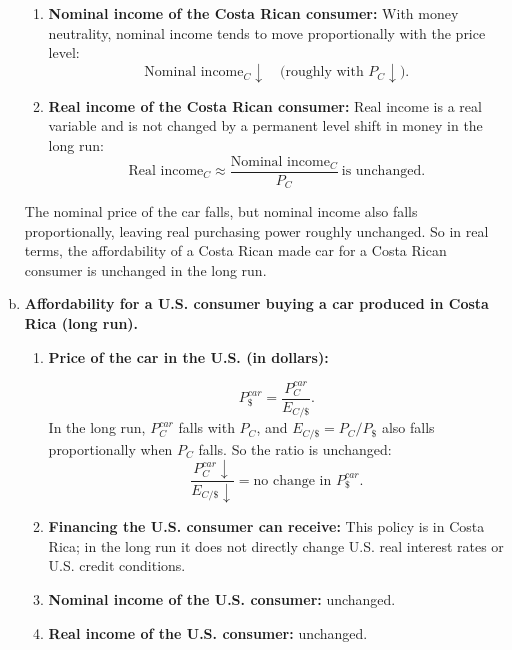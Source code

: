 \documentclass[11pt]{article}
\newcommand{\usd}{\text{\$}}
\newenvironment{problem}[2][Problem]{\begin{trivlist}
\item[\hskip \labelsep {\bfseries #1}\hskip \labelsep {\bfseries #2.}]
\leavevmode\par
}{\end{trivlist}}
\begin{document}
\begin{problem}{1}
\begin{enumerate}[(a)]
\begin{enumerate}[(1)]
\item \textbf{Nominal income of the Costa Rican consumer:}
With money neutrality, nominal income tends to move proportionally with the price level:
\[
\text{Nominal income}_C \downarrow \quad \text{(roughly with } P_C\downarrow\text{).}
\]

\item \textbf{Real income of the Costa Rican consumer:}
Real income is a real variable and is not changed by a permanent level shift in money in the long run:
\[
\text{Real income}_C \approx \frac{\text{Nominal income}_C}{P_C} \ \text{is unchanged.}
\]
\end{enumerate}

The nominal price of the car falls, but nominal income also falls proportionally, leaving real purchasing power roughly unchanged. So in real terms, the affordability of a Costa Rican made car for a Costa Rican consumer is unchanged in the long run.

\item \textbf{Affordability for a U.S. consumer buying a car produced in Costa Rica (long run).}

\begin{enumerate}[(1)]
\item \textbf{Price of the car in the U.S. (in dollars):}

\[
P^{car}_{\usd} = \frac{P^{car}_C}{E_{C/\usd}}.
\]
In the long run, $P^{car}_C$ falls with $P_C$, and $E_{C/\usd} = P_C/P_{\usd}$ also falls proportionally when $P_C$ falls.
So the ratio is unchanged:
\[
\frac{P^{car}_C \downarrow}{E_{C/\usd}\downarrow} = \text{no change in } P^{car}_{\usd}.
\]


\item \textbf{Financing the U.S. consumer can receive:}
This policy is in Costa Rica; in the long run it does not directly change U.S. real interest rates or U.S. credit conditions.

\item \textbf{Nominal income of the U.S. consumer:} unchanged.

\item \textbf{Real income of the U.S. consumer:} unchanged.
\end{enumerate}

\end{enumerate}
\end{problem}
\end{document}
